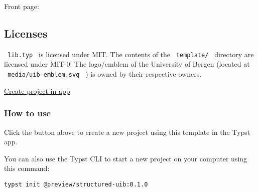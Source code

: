 \begin{Shaded}
\begin{Highlighting}[]

\NormalTok{  ),}
\NormalTok{  ),}
\NormalTok{)}

\end{Highlighting}
\end{Shaded}

Front page:

\subsection{Licenses}\label{licenses}

\texttt{\ lib.typ\ } is licensed under MIT. The contents of the
\texttt{\ template/\ } directory are licensed under MIT-0. The
logo/emblem of the University of Bergen (located at
\texttt{\ media/uib-emblem.svg\ } ) is owned by their respective owners.

\href{/app?template=structured-uib&version=0.1.0}{Create project in app}

\subsubsection{How to use}\label{how-to-use}

Click the button above to create a new project using this template in
the Typst app.

You can also use the Typst CLI to start a new project on your computer
using this command:

\begin{verbatim}
typst init @preview/structured-uib:0.1.0
\end{verbatim}

